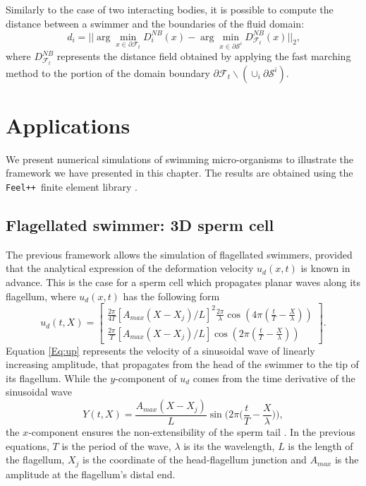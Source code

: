\documentclass[graybox]{svmult}
\newcommand{\feelpp}{\texttt{Feel++}}
\newcommand{\Fluid}{\mathcal{F}} %
\newcommand{\Vel}{u} %
\newcommand{\Solid}{\mathcal{S}} %
\begin{document}
Similarly to the case of two interacting bodies, it is possible to compute the distance between a swimmer and the boundaries of the fluid domain: 
$$
d_{i} = ||\arg\min_{x \in \partial \Fluid_t} D_i^{NB}(x) - \arg\min_{x \in \partial \Solid^i} D_{\Fluid_t}^{NB}(x)||_2 \mbox{,}
$$
where $D_{\Fluid_t}^{NB}$ represents the distance field obtained by applying the fast marching method 
to the portion of the domain boundary $\partial \Fluid_t \backslash ( \cup_i \partial \Solid^i ) $. 



\section{Applications}
\label{Sec:Applications}
% 

We present numerical simulations of swimming micro-organisms to illustrate the framework we have presented in this chapter. The results are obtained using the \feelpp\ finite element library \cite{feelpp-ref}.

\subsection{Flagellated swimmer: 3D sperm cell}
The previous framework allows the simulation of flagellated swimmers, provided that the analytical expression of the deformation velocity $\Vel_d(x,t)$ is known in advance. This is the case for a sperm cell which propagates planar waves along its flagellum, where $\Vel_d(x,t)$ has the following form \cite{RazaviAhmadi2015}
\begin{equation}
	\Vel_d(t,X)=
	\begin{bmatrix}
		\frac{2\pi}{4T}[A_{max}(X-X_j)/L]^2\frac{2\pi}{\lambda}\cos(4\pi (\frac{t}{T}-\frac{X}{\lambda})) \\
		\frac{2\pi}{T}[A_{max}(X-X_j)/L]\cos(2\pi (\frac{t}{T}-\frac{X}{\lambda}))
	\end{bmatrix}.
	\label{Eq:up}
\end{equation}
Equation \eqref{Eq:up} represents the velocity of a sinusoidal wave of linearly increasing amplitude, that propagates from the head of the swimmer to the tip of its flagellum. 
While the $y$-component of $\Vel_d$ comes from the time derivative of the sinusoidal wave
\begin{equation*}
	Y(t,X) = \frac{A_{max}(X-X_j)}{L} \sin\Bigg(2\pi \Bigg(\frac{t}{T}-\frac{X}{\lambda}\Bigg)\Bigg),
\end{equation*}
the $x$-component ensures the non-extensibility of the sperm tail \cite{taylor_geoffrey_ingram_analysis_1951}. 
In the previous equations, $T$ is the period of the wave, $\lambda$ is its the wavelength, $L$ is the length of the flagellum, $X_j$ is the coordinate of the head-flagellum junction and $A_{max}$ is the amplitude at the flagellum's distal end.
\end{document}
